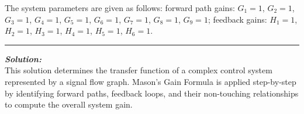 \documentclass[11pt]{article}
\begin{document}
\noindent The system parameters are given as follows: forward path gains: \( G_1 = 1 \), \( G_2 = 1 \), \( G_3 = 1 \), \( G_4 = 1 \), \( G_5 = 1 \), \( G_6 = 1 \), \( G_7 = 1 \), \( G_8 = 1 \), \( G_9 = 1 \); feedback gains: \( H_1 = 1 \), \( H_2 = 1 \), \( H_3 = 1 \), \( H_4 = 1 \), \( H_5 = 1 \), \( H_6 = 1 \). \\
\noindent\rule{\textwidth}{1pt}

\vspace{12pt}   

\noindent \textbf{\textit{Solution:}}
\\ This solution determines the transfer function of a complex control system represented by a signal flow graph. Mason's Gain Formula is applied step-by-step by identifying forward paths, feedback loops, and their non-touching relationships to compute the overall system gain.\\
\end{document}
